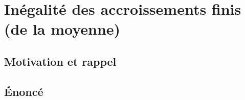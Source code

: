\chapter{Inégalité des accroissements finis (de la moyenne)}

\section{Motivation et rappel}

\section{Énoncé}
